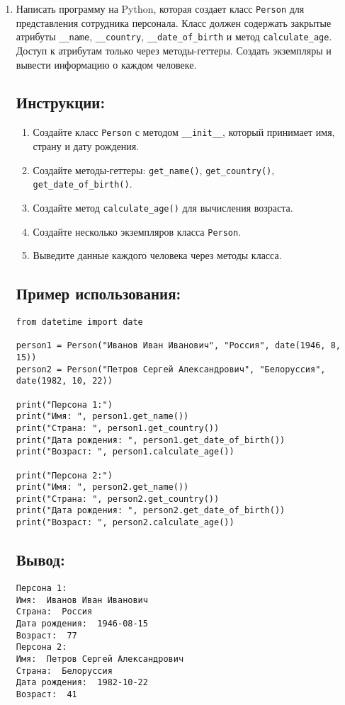 \begin{enumerate}

\item
Написать программу на Python, которая создает класс \texttt{Person} для представления сотрудника персонала. Класс должен содержать закрытые атрибуты \texttt{\_\_name}, \texttt{\_\_country}, \texttt{\_\_date\_of\_birth} и метод \texttt{calculate\_age}. Доступ к атрибутам только через методы-геттеры. Создать экземпляры и вывести информацию о каждом человеке.

\subsection*{Инструкции:}
\begin{enumerate}
    \item Создайте класс \texttt{Person} с методом \texttt{\_\_init\_\_}, который принимает имя, страну и дату рождения.
    \item Создайте методы-геттеры: \texttt{get\_name()}, \texttt{get\_country()}, \texttt{get\_date\_of\_birth()}.
    \item Создайте метод \texttt{calculate\_age()} для вычисления возраста.
    \item Создайте несколько экземпляров класса \texttt{Person}.
    \item Выведите данные каждого человека через методы класса.
\end{enumerate}

\subsection*{Пример использования:}
\begin{lstlisting}[caption=Пример кода]
from datetime import date

person1 = Person("Иванов Иван Иванович", "Россия", date(1946, 8, 15))
person2 = Person("Петров Сергей Александрович", "Белоруссия", date(1982, 10, 22))

print("Персона 1:")
print("Имя: ", person1.get_name())
print("Страна: ", person1.get_country())
print("Дата рождения: ", person1.get_date_of_birth())
print("Возраст: ", person1.calculate_age())

print("Персона 2:")
print("Имя: ", person2.get_name())
print("Страна: ", person2.get_country())
print("Дата рождения: ", person2.get_date_of_birth())
print("Возраст: ", person2.calculate_age())
\end{lstlisting}

\subsection*{Вывод:}
\begin{lstlisting}[caption=Ожидаемый вывод]
Персона 1:
Имя:  Иванов Иван Иванович
Страна:  Россия
Дата рождения:  1946-08-15
Возраст:  77
Персона 2:
Имя:  Петров Сергей Александрович
Страна:  Белоруссия
Дата рождения:  1982-10-22
Возраст:  41
\end{lstlisting}


\end{enumerate}

